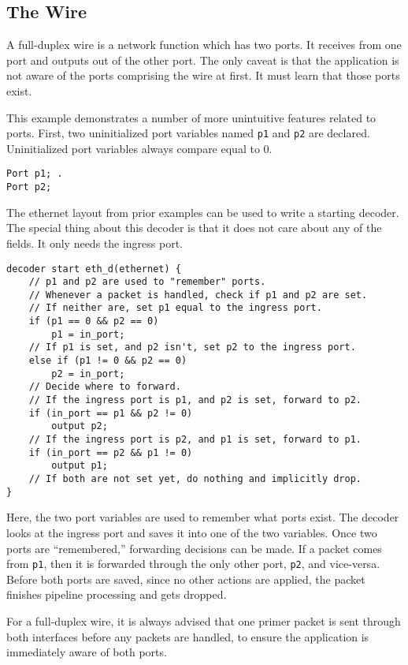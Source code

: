 \subsection{The Wire} \label{tut:wire}

A full-duplex wire is a network function which has two ports. 
It receives from one port
and outputs out of the other port. The only caveat is that the application is
not aware of the ports comprising the wire at first. It must learn that those
ports exist.

This example demonstrates a number of more unintuitive features related to
ports. First, two uninitialized port variables named \texttt{p1} and
\texttt{p2} are declared. Uninitialized port variables always compare equal to 0.

\begin{codepage}
\begin{lstlisting}
Port p1; .
Port p2;
\end{lstlisting}
\end{codepage}

The ethernet layout from prior examples can be used to write a starting decoder. The
special thing about this decoder is that it does not care about any of the fields.
It only needs the ingress port.

\begin{codepage}
\begin{lstlisting}
decoder start eth_d(ethernet) {
	// p1 and p2 are used to "remember" ports.
	// Whenever a packet is handled, check if p1 and p2 are set.
	// If neither are, set p1 equal to the ingress port.
	if (p1 == 0 && p2 == 0)
		p1 = in_port;
	// If p1 is set, and p2 isn't, set p2 to the ingress port.
	else if (p1 != 0 && p2 == 0)
		p2 = in_port;
	// Decide where to forward.
	// If the ingress port is p1, and p2 is set, forward to p2.
	if (in_port == p1 && p2 != 0)
		output p2;
	// If the ingress port is p2, and p1 is set, forward to p1.
	if (in_port == p2 && p1 != 0)
		output p1;
	// If both are not set yet, do nothing and implicitly drop.
}
\end{lstlisting}
\end{codepage}

Here, the two port variables are used to remember what ports exist. The decoder
looks at the ingress port and saves it into one of the two variables. Once two
ports are ``remembered,'' forwarding decisions can be made. If a packet comes from
\texttt{p1}, then it is forwarded through the only other port, \texttt{p2}, and
vice-versa. Before both ports are saved, since no other actions are applied, the
packet finishes pipeline processing and gets dropped.

For a full-duplex wire, it is always advised that one primer packet is sent 
through both interfaces before any packets are handled, to ensure the application 
is immediately aware of both ports.
